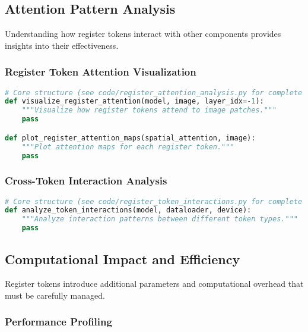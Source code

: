 \subsection{Attention Pattern Analysis}

Understanding how register tokens interact with other components provides insights into their effectiveness.

\subsubsection{Register Token Attention Visualization}

\begin{lstlisting}[language=Python, caption=Analyzing register token attention patterns]
# Core structure (see code/register_attention_analysis.py for complete implementation)
def visualize_register_attention(model, image, layer_idx=-1):
    """Visualize how register tokens attend to image patches."""
    pass

def plot_register_attention_maps(spatial_attention, image):
    """Plot attention maps for each register token."""
    pass
\end{lstlisting}

\subsubsection{Cross-Token Interaction Analysis}

\begin{lstlisting}[language=Python, caption=Analyzing interactions between register and other tokens]
# Core structure (see code/register_token_interactions.py for complete implementation)
def analyze_token_interactions(model, dataloader, device):
    """Analyze interaction patterns between different token types."""
    pass
\end{lstlisting}

\subsection{Computational Impact and Efficiency}

Register tokens introduce additional parameters and computational overhead that must be carefully managed.

\subsubsection{Performance Profiling}

